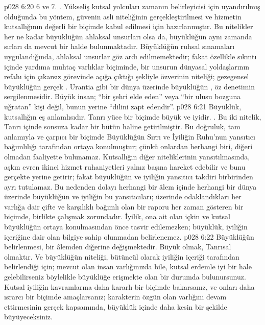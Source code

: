 \vs p028 6:20 6 ve 7. . Yükseliş kutsal yolcuları zamanın belirleyicisi için uyandırılmış olduğunda bu yöntem, güvenin asli niteliğinin gerçekleştirilmesi ve hizmetin kutsallığının değerli bir biçimde kabul edilmesi için hazırlanmıştır. Bu nitelikler her ne kadar büyüklüğün ahlaksal unsurları olsa da, büyüklüğün aynı zamanda sırları da mevcut bir halde bulunmaktadır. Büyüklüğün ruhsal sınamaları uygulandığında, ahlaksal unsurlar göz ardı edilmemektedir; fakat özellikle sıkıntı içinde yardıma muhtaç varlıklar biçiminde, bir unsurun dünyasal yoldaşlarının refahı için çıkarsız görevinde açığa çıktığı şekliyle özverinin niteliği; gezegensel büyüklüğün gerçek . Urantia gibi bir dünya üzerinde büyüklüğün , öz denetimin sergilenmesidir. Büyük insan; “bir şehri elde eden” veya “bir ulusu bozguna uğratan” kişi değil, bunun yerine “dilini zapt edendir”.
\vs p028 6:21 Büyüklük, kutsallığın eş anlamlısıdır. Tanrı yüce bir biçimde büyük ve iyidir. . Bu iki nitelik, Tanrı içinde sonsuza kadar bir bütün haline getirilmiştir. Bu doğruluk, tam anlamıyla ve çarpıcı bir biçimde Büyüklüğün Sırrı ve İyiliğin Ruhu’nun yansıtıcı bağımlılığı tarafından ortaya konulmuştur; çünkü onlardan herhangi biri, diğeri olmadan faaliyette bulunamaz. Kutsallığın diğer niteliklerinin yansıtılmasında, aşkın evren ikinci hizmet ruhaniyetleri yalnız başına hareket edebilir ve bunu gerçekte yerine getirir; fakat büyüklüğün ve iyiliğin yansıtıcı takdiri birbirinden ayrı tutulamaz. Bu nedenden dolayı herhangi bir âlem içinde herhangi bir dünya üzerinde büyüklüğün ve iyiliğin bu yansıtıcıları; üzerinde odaklandıkları her varlığa dair çifte ve karşılıklı bağımlı olan bir raporu her zaman gösteren bir biçimde, birlikte çalışmak zorundadır. İyilik, ona ait olan içkin ve kutsal büyüklüğün ortaya konulmasından önce tasvir edilemezken; büyüklük, iyiliğin içeriğine dair olan bilgiye sahip olunmadan belirlenemez.
\vs p028 6:22 Büyüklüğün belirlenmesi, bir âlemden diğerine değişmektedir. Büyük olmak, Tanrısal olmaktır. Ve büyüklüğün niteliği, bütüncül olarak iyiliğin içeriği tarafından belirlendiği için; mevcut olan insan varlığınızda bile, kutsal erdemle iyi bir hale gelebilirseniz böylelikle büyüklüğe erişmekte olan bir durumda bulunursunuz. Kutsal iyiliğin kavramlarına daha kararlı bir biçimde bakarsanız, ve onları daha ısrarcı bir biçimde amaçlarsanız; karakterin özgün olan varlığını devam ettirmesinin gerçek kapsamında, büyüklük içinde daha kesin bir şekilde büyüyeceksiniz.
